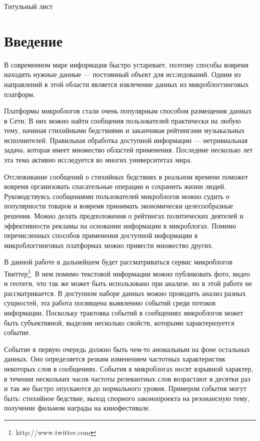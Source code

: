 \documentclass[12pt, a4paper]{article}
\begin{document}
Титульный лист\newpage

\tableofcontents\newpage

  \section{Введение}
  	В современном мире информация быстро устаревает, поэтому способы вовремя находить нужные данные --- постоянный объект для исследований. Одним из направлений в этой области является извлечение данных из микроблоггинговых платформ.
  	
  	Платформы микроблогов стали очень популярным способом размещения данных в Сети. В них можно найти сообщения пользователей практически на любую тему, начиная стихийными бедствиями и заканчивая рейтингами музыкальных исполнителей. Правильная обработка доступной информации --- нетривиальная задача, которая имеет множество областей применения. Последние несколько лет эта тема активно исследуется во многих университетах мира.
  	
	Отслеживание сообщений о стихийных бедствиях в реальном времени поможет вовремя организовать спасательные операции и сохранить жизни людей\cite{nuggets}. Руководствуясь сообщениями пользователей микроблогов можно судить о популярности товаров и вовремя принимать экономически целесообразные решения. Можно делать предположения о рейтингах политических деятелей и эффективности рекламы на основании информации в микроблогах. Помимо перечисленных способов применения доступной информации в микроблоггинговых платформах можно привести множество других.
	
	В данной работе в дальнейшем будет рассматриваться сервис микроблогов Твиттер\footnote{http://www.twitter.com}. В нем помимо текстовой информации можно публиковать фото, видео и геотеги, что так же может быть использовано при анализе, но в этой работе не рассматривается. В доступном наборе данных можно проводить анализ разных сущностей, эта работа посвящена выявлению событий среди потоков информации. Поскольку трактовка событий в сообщениях микроблогов может быть субъективной, выделим несколько свойств, которыми характеризуется событие.
	
	Событие в первую очередь должно быть чем-то аномальным на фоне остальных данных. Оно определяется резким изменением частотных характеристик некоторых слов в сообщениях. События в микроблогах носят взрывной характер, в течении нескольких часов частоты релевантных слов возрастают в десятки раз и так же быстро опускаются до нормального уровня. Примером события могут быть: стихийное бедствие, выход спорного законопроекта на резонансную тему, получение фильмом награды на кинофестивале.
	
\end{document}
